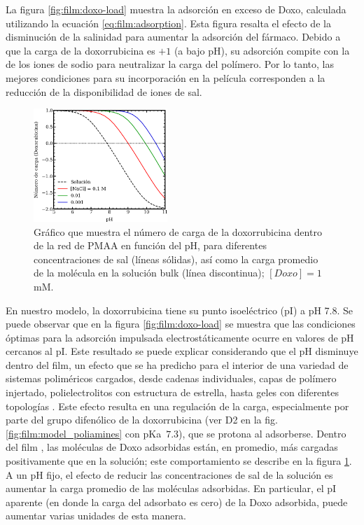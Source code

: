 La figura  \ref{fig:film:doxo-load} muestra la adsorci\'on en exceso de Doxo, calculada utilizando la ecuaci\'on \ref{eq:film:adsorption}. Esta figura resalta el efecto de la disminuci\'on de la salinidad para aumentar la adsorci\'on del f\'armaco. Debido a que la carga de la doxorrubicina es $+1$ (a bajo pH), su adsorci\'on compite con la de los iones de sodio para neutralizar la carga del pol\'imero. Por lo tanto, las mejores condiciones para su incorporaci\'on en la pel\'icula corresponden a la reducci\'on de la disponibilidad de iones  de sal.


\begin{figure}[!htb]
	\centering
	\includegraphics[width=0.45\textwidth]{Figures/graph-film/doxo-charge.png}
	\caption{Gr\'afico que muestra el n\'umero de carga de la doxorrubicina dentro de la red de PMAA en funci\'on del pH, para diferentes concentraciones de sal (l\'ineas s\'olidas), as\'i como la carga promedio de la mol\'ecula en la soluci\'on bulk (l\'inea discontinua); $[Doxo]=1$ mM. }
	\label{fig:film:doxo-charge}
\end{figure}

En nuestro modelo, la doxorrubicina tiene su punto isoel\'ectrico (pI) a pH 7.8. Se puede observar que en  la figura  \ref{fig:film:doxo-load} se muestra que las condiciones \'optimas para la adsorci\'on impulsada electrost\'aticamente ocurre en valores de pH cercanos al pI. Este resultado se puede explicar considerando que el pH disminuye dentro del film, un efecto que se ha predicho para el interior de una variedad de sistemas polim\'ericos cargados, desde cadenas individuales, capas de pol\'imero injertado, polielectrolitos con estructura de estrella, hasta geles con diferentes topolog\'ias  \cite{Nap2006,Borisov2011,Longo2011,Polotsky2013,Murmiliuk2018}. Este efecto resulta en una regulaci\'on de la carga, especialmente por parte del grupo difen\'olico de la doxorrubicina (ver D2 en la fig. \ref{fig:film:model_poliamines} con pKa~$7.3$), que se protona al adsorberse. Dentro del film , las mol\'eculas de Doxo adsorbidas est\'an, en promedio, m\'as cargadas positivamente que en la soluci\'on; este comportamiento se describe en la figura \ref{fig:film:doxo-charge}. A un pH fijo, el efecto de reducir las concentraciones de sal de la soluci\'on es aumentar la carga promedio de las mol\'eculas adsorbidas. En particular, el pI aparente (en donde la carga del adsorbato es cero) de la Doxo adsorbida, puede aumentar varias unidades de esta manera.

